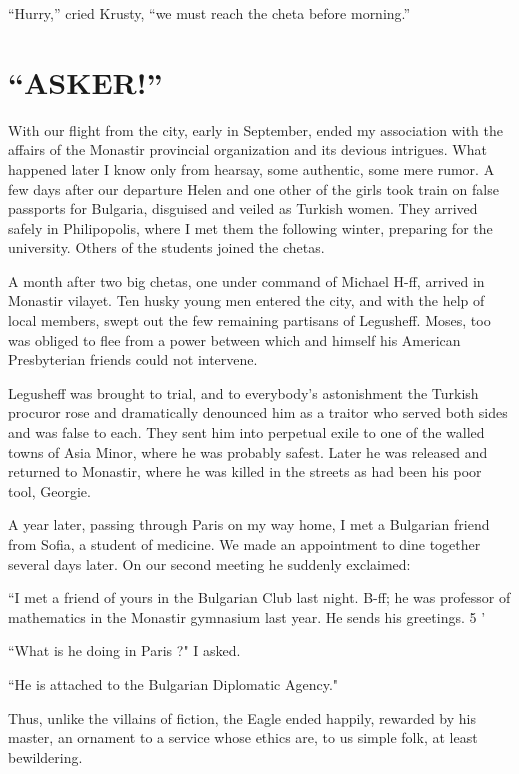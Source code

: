 \documentclass[a5paper,12pt]{book}
\begin{document}
“Hurry,” cried Krusty, “we must reach the cheta before morning.”


\chapter{“ASKER!”}

With our flight from the city, early in September, ended my association with the affairs of the Monastir provincial organization and its devious intrigues. What happened later I know only from hearsay, some authentic, some mere rumor. A few days after our departure Helen and one other of the girls took train on false passports for Bulgaria, disguised and veiled as Turkish women. They arrived safely in Philipopolis, where I met them the following winter, preparing for the university. Others of the students joined the chetas.

A month after two big chetas, one under command of Michael H-ff, arrived in Monastir vilayet. Ten husky young men entered the city, and with the help of local members, swept out the few remaining partisans of Legusheff. Moses, too was obliged to flee from a power between which and himself his American Presbyterian friends could not intervene.

Legusheff was brought to trial, and to everybody’s astonishment the Turkish procuror rose and dramatically denounced him as a traitor who served both sides and was false to each. They sent him into perpetual exile to one of the walled towns of Asia Minor, where he was probably safest. Later he was released and returned to Monastir, where he was killed in the streets as had been his poor tool, Georgie.

A year later, passing through Paris on my way home, I met a Bulgarian friend from Sofia, a student of medicine. We made an appointment to dine together several days later. On our second meeting he suddenly exclaimed:

“I met a friend of yours in the Bulgarian Club last night. B-ff; he was professor of mathematics in the Monastir gymnasium last year. He sends his greetings. 5 '

“What is he doing in Paris ?" I asked.

“He is attached to the Bulgarian Diplomatic Agency."

Thus, unlike the villains of fiction, the Eagle ended happily, rewarded by his master, an ornament to a service whose ethics are, to us simple folk, at least bewildering.
\end{document}
